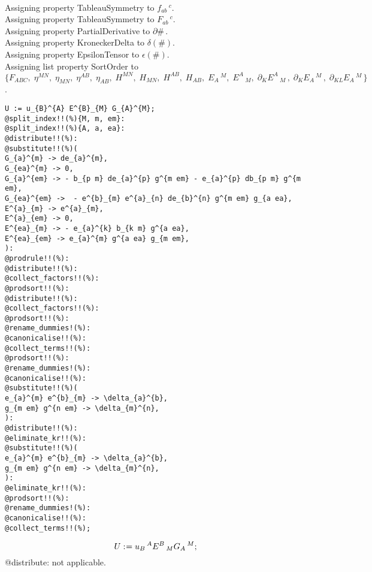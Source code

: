 \documentclass[11pt]{article}
\def\specialcolon{\mathrel{\mathop{:}}\hspace{-.5em}}
\begin{document}
\\
Assigning property TableauSymmetry to ${f}_{a b}\,^{c}$.
\\
Assigning property TableauSymmetry to ${F}_{a b}\,^{c}$.
\\
Assigning property PartialDerivative to $\partial{\#}\, $.
\\
Assigning property KroneckerDelta to $\delta(\#)$.
\\
Assigning property EpsilonTensor to $\epsilon(\#)$.
\\
Assigning list property SortOrder to $\{{F}_{A B C},\; {\eta}^{M N},\; {\eta}_{M N},\; {\eta}^{A B},\; {\eta}_{A B},\; {H}^{M N},\; {H}_{M N},\; {H}^{A B},\; {H}_{A B},\; {E}_{A}\,^{M},\; {E}^{A}\,_{M},\; {\partial}_{K}{{E}^{A}\,_{M}}\, ,\; {\partial}_{K}{{E}_{A}\,^{M}}\, ,\; {\partial}_{K L}{{E}_{A}\,^{M}}\, \}$.
\\
{\color[named]{Blue}\begin{verbatim}
U := u_{B}^{A} E^{B}_{M} G_{A}^{M};
@split_index!!(%){M, m, em}:
@split_index!!(%){A, a, ea}:
@distribute!!(%):
@substitute!!(%)(
G_{a}^{m} -> de_{a}^{m},
G_{ea}^{m} -> 0,
G_{a}^{em} -> - b_{p m} de_{a}^{p} g^{m em} - e_{a}^{p} db_{p m} g^{m em},
G_{ea}^{em} ->  - e^{b}_{m} e^{a}_{n} de_{b}^{n} g^{m em} g_{a ea},
E^{a}_{m} -> e^{a}_{m},
E^{a}_{em} -> 0,
E^{ea}_{m} -> - e_{a}^{k} b_{k m} g^{a ea},
E^{ea}_{em} -> e_{a}^{m} g^{a ea} g_{m em},
):
@prodrule!!(%):
@distribute!!(%):
@collect_factors!!(%):
@prodsort!!(%):
@distribute!!(%):
@collect_factors!!(%):
@prodsort!!(%):
@rename_dummies!(%):
@canonicalise!!(%):
@collect_terms!!(%):
@prodsort!!(%):
@rename_dummies!(%):
@canonicalise!!(%):
@substitute!!(%)(
e_{a}^{m} e^{b}_{m} -> \delta_{a}^{b},
g_{m em} g^{n em} -> \delta_{m}^{n},
):
@distribute!!(%):
@eliminate_kr!!(%):
@substitute!!(%)(
e_{a}^{m} e^{b}_{m} -> \delta_{a}^{b},
g_{m em} g^{n em} -> \delta_{m}^{n},
):
@eliminate_kr!!(%):
@prodsort!!(%):
@rename_dummies!(%):
@canonicalise!!(%):
@collect_terms!!(%);
\end{verbatim}}
\begin{dmath*}[compact, spread=2pt]
U\specialcolon{}= {u}_{B}\,^{A} {E}^{B}\,_{M} {G}_{A}\,^{M};
\end{dmath*}
@distribute: not applicable.
\end{document}
